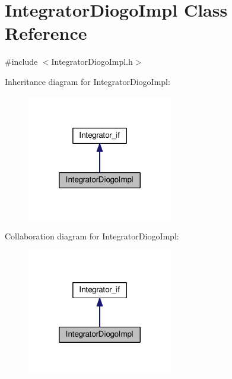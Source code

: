 \hypertarget{class_integrator_diogo_impl}{\section{Integrator\-Diogo\-Impl Class Reference}
\label{class_integrator_diogo_impl}
}


{\ttfamily \#include $<$Integrator\-Diogo\-Impl.\-h$>$}



Inheritance diagram for Integrator\-Diogo\-Impl\-:
\nopagebreak
\begin{figure}[H]
\begin{center}
\leavevmode
\includegraphics[width=180pt]{class_integrator_diogo_impl__inherit__graph}
\end{center}
\end{figure}


Collaboration diagram for Integrator\-Diogo\-Impl\-:
\nopagebreak
\begin{figure}[H]
\begin{center}
\leavevmode
\includegraphics[width=180pt]{class_integrator_diogo_impl__coll__graph}
\end{center}
\end{figure}
